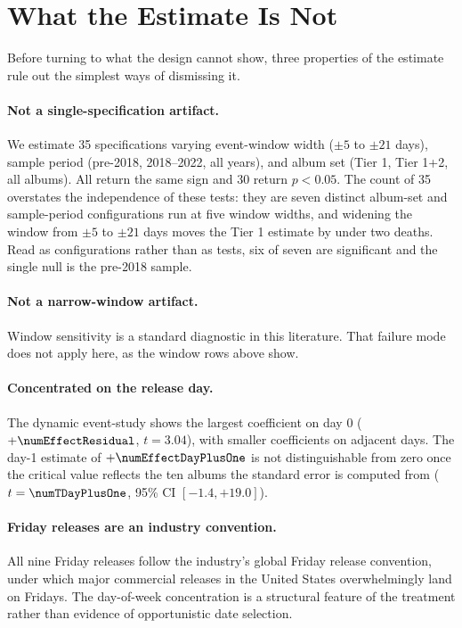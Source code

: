 \documentclass[11pt]{article}
\begin{document}
\section{What the Estimate Is Not}
\label{sec:supporting}

Before turning to what the design cannot show, three properties of the estimate rule out the
simplest ways of dismissing it.

\paragraph{Not a single-specification artifact.}
We estimate 35 specifications varying event-window width ($\pm 5$ to $\pm 21$ days), sample period
(pre-2018, 2018--2022, all years), and album set (Tier 1, Tier 1+2, all \numNAllAlbums{} albums).
All return the same sign and 30 return $p < 0.05$. The count of 35 overstates the independence of
these tests: they are seven distinct album-set and sample-period configurations run at five window
widths, and widening the window from $\pm 5$ to $\pm 21$ days moves the Tier 1 estimate by under
two deaths. Read as configurations rather than as tests, six of seven are significant and the
single null is the pre-2018 sample.



\paragraph{Not a narrow-window artifact.}
Window sensitivity is a standard diagnostic in this literature.
That failure mode does not apply here, as the window rows above show.

\paragraph{Concentrated on the release day.}
The dynamic event-study shows the largest coefficient on day 0 ($+\numEffectResidual$,
$t = 3.04$), with smaller coefficients on adjacent days. The day-1 estimate of
$+\numEffectDayPlusOne$ is not distinguishable from zero once the critical value reflects the ten
albums the standard error is computed from ($t = \numTDayPlusOne$, 95\% CI $[-1.4, +19.0]$).

\paragraph{Friday releases are an industry convention.}
All nine Friday releases follow the industry's global Friday release convention, under which major
commercial releases in the United States overwhelmingly land on Fridays. The day-of-week
concentration is a structural feature of the treatment rather than evidence of opportunistic date
selection.
\end{document}
